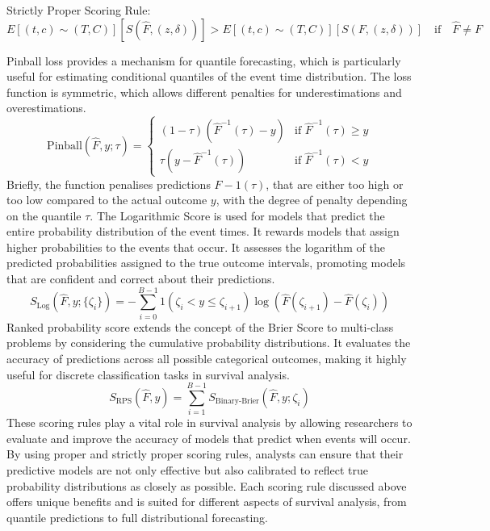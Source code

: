 \noindent Strictly Proper Scoring Rule:
\begin{equation} \label{eq:strictproper}
E[(t,c) \sim (T,C)][S(\hat{F}, (z, \delta))] > E[(t,c) \sim (T,C)][S(F, (z, \delta))] \quad \text{if} \quad \hat{F} \neq F
\end{equation}


\noindent Pinball loss \parencite{yanagisawa_proper_2023} provides a mechanism for quantile forecasting, which is particularly useful for estimating conditional quantiles of the event time distribution. The loss function is symmetric, which allows different penalties for underestimations and overestimations.
\begin{equation} \label{eq:pinball}
{\text{Pinball}}(\hat{F}, y; \tau) = \begin{cases} 
(1-\tau)(\hat{F}^{-1}(\tau) - y) & \text{if } \hat{F}^{-1}(\tau) \geq y \\
\tau(y - \hat{F}^{-1}(\tau)) & \text{if } \hat{F}^{-1}(\tau) < y 
\end{cases}
\end{equation}
Briefly, the function penalises predictions \(F-1(\tau)\), that are either too high or too low compared to the actual outcome \(y\), with the degree of penalty depending on the quantile \(\tau\). The Logarithmic Score \parencite{yanagisawa_proper_2023} is used for models that predict the entire probability distribution of the event times. It rewards models that assign higher probabilities to the events that occur. It assesses the logarithm of the predicted probabilities assigned to the true outcome intervals, promoting models that are confident and correct about their predictions.
\begin{equation} \label{eq:logscore}S_{\text{Log}}(\hat{F}, y; \{\zeta_i\}) = -\sum_{i=0}^{B-1} 1(\zeta_i < y \leq \zeta_{i+1}) \log(\hat{F}(\zeta_{i+1}) - \hat{F}(\zeta_i))\end{equation}
Ranked probability score \parencite{yanagisawa_proper_2023} extends the concept of the Brier Score to multi-class problems by considering the cumulative probability distributions. It evaluates the accuracy of predictions across all possible categorical outcomes, making it highly useful for discrete classification tasks in survival analysis.
\begin{equation} \label{eq:ranked}S_{\text{RPS}}(\hat{F}, y) = \sum_{i=1}^{B-1} S_{\text{Binary-Brier}}(\hat{F}, y; \zeta_i)\end{equation}
These scoring rules play a vital role in survival analysis by allowing researchers to evaluate and improve the accuracy of models that predict when events will occur. By using proper and strictly proper scoring rules, analysts can ensure that their predictive models are not only effective but also calibrated to reflect true probability distributions as closely as possible. Each scoring rule discussed above offers unique benefits and is suited for different aspects of survival analysis, from quantile predictions to full distributional forecasting.

